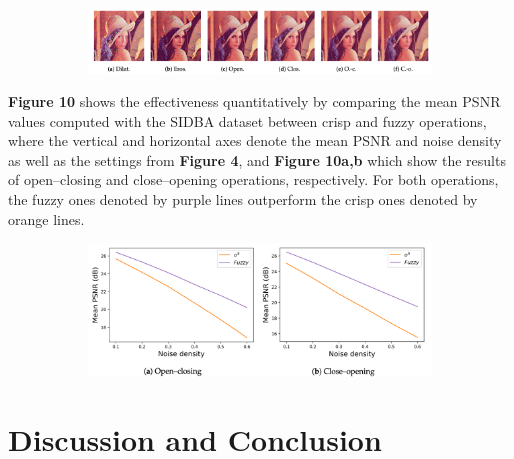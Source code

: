 \begin{figure}[H]
    \centering
    \begin{subfigure}[t]{.9\textwidth}
    \includegraphics[width=0.9\linewidth]{images/result/fuzzy.png}
    \centering
    \end{subfigure}
    \caption{}
\end{figure}

\textbf{Figure 10} shows the effectiveness quantitatively by comparing the mean PSNR values computed with the SIDBA dataset between crisp and fuzzy operations, where the vertical and horizontal axes denote the mean PSNR and noise density as well as the settings from \textbf{Figure 4}, and \textbf{Figure 10a,b} which show the results of open–closing and close–opening operations, respectively. For both operations, the fuzzy ones denoted by purple lines outperform the crisp ones denoted by orange lines.

\begin{figure}[H]
    \centering
    \begin{subfigure}[t]{.9\textwidth}
    \includegraphics[width=0.9\linewidth]{images/result/crisp_vs_fuzzy.png}
    \centering
    \end{subfigure}
    \caption{}
\end{figure}


\section*{Discussion and Conclusion}

